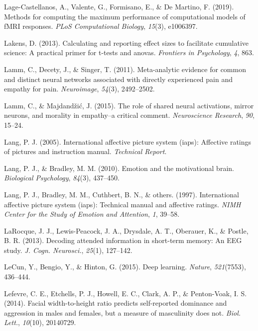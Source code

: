 \documentclass[12pt,american,a4paper,oneside,]{memoir} %
\begin{document}
\leavevmode\hypertarget{ref-lage2019methods}{}%
Lage-Castellanos, A., Valente, G., Formisano, E., \& De Martino, F. (2019). Methods for computing the maximum performance of computational models of fMRI responses. \emph{PLoS Computational Biology}, \emph{15}(3), e1006397.

\leavevmode\hypertarget{ref-lakens2013calculating}{}%
Lakens, D. (2013). Calculating and reporting effect sizes to facilitate cumulative science: A practical primer for t-tests and anovas. \emph{Frontiers in Psychology}, \emph{4}, 863.

\leavevmode\hypertarget{ref-lamm2011meta}{}%
Lamm, C., Decety, J., \& Singer, T. (2011). Meta-analytic evidence for common and distinct neural networks associated with directly experienced pain and empathy for pain. \emph{Neuroimage}, \emph{54}(3), 2492--2502.

\leavevmode\hypertarget{ref-lamm2015role}{}%
Lamm, C., \& Majdandžić, J. (2015). The role of shared neural activations, mirror neurons, and morality in empathy--a critical comment. \emph{Neuroscience Research}, \emph{90}, 15--24.

\leavevmode\hypertarget{ref-lang2005international}{}%
Lang, P. J. (2005). International affective picture system (iaps): Affective ratings of pictures and instruction manual. \emph{Technical Report}.

\leavevmode\hypertarget{ref-lang2010emotion}{}%
Lang, P. J., \& Bradley, M. M. (2010). Emotion and the motivational brain. \emph{Biological Psychology}, \emph{84}(3), 437--450.

\leavevmode\hypertarget{ref-lang1997international}{}%
Lang, P. J., Bradley, M. M., Cuthbert, B. N., \& others. (1997). International affective picture system (iaps): Technical manual and affective ratings. \emph{NIMH Center for the Study of Emotion and Attention}, \emph{1}, 39--58.

\leavevmode\hypertarget{ref-LaRocque2013-sh}{}%
LaRocque, J. J., Lewis-Peacock, J. A., Drysdale, A. T., Oberauer, K., \& Postle, B. R. (2013). Decoding attended information in short-term memory: An EEG study. \emph{J. Cogn. Neurosci.}, \emph{25}(1), 127--142.

\leavevmode\hypertarget{ref-LeCun2015-xa}{}%
LeCun, Y., Bengio, Y., \& Hinton, G. (2015). Deep learning. \emph{Nature}, \emph{521}(7553), 436--444.

\leavevmode\hypertarget{ref-Lefevre2014-vo}{}%
Lefevre, C. E., Etchells, P. J., Howell, E. C., Clark, A. P., \& Penton-Voak, I. S. (2014). Facial width-to-height ratio predicts self-reported dominance and aggression in males and females, but a measure of masculinity does not. \emph{Biol. Lett.}, \emph{10}(10), 20140729.
\end{document}
